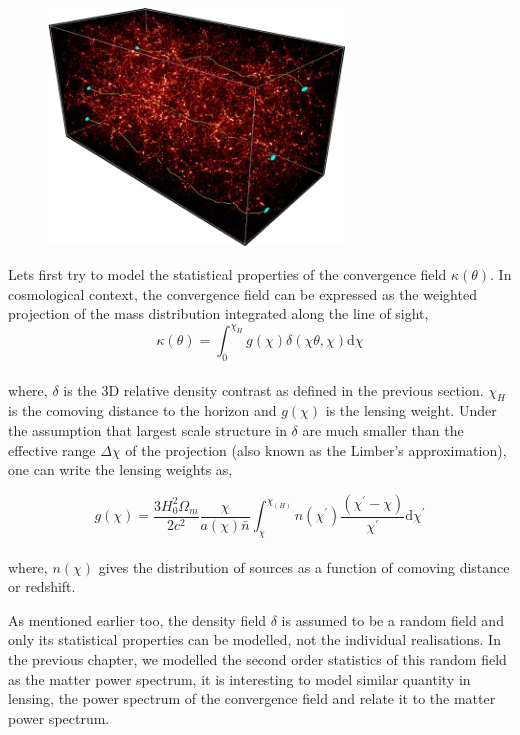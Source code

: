 \begin{figure}
	\centering
	\includegraphics[width=0.7\textwidth]{figures/weaklensing.png}
	\caption{}
	\label{fig:wl}
\end{figure}

Lets first try to model the statistical properties of the convergence field
$\kappa(\theta)$. In cosmological context, the convergence field can be expressed
as the weighted projection of the mass distribution integrated along the line of 
sight,
\begin{equation}
	\kappa(\theta) = \int_0^{\chi_H} g(\chi)\delta(\chi\theta,\chi) \mathrm{d}\chi
\end{equation}
\\
where, $\delta$ is the 3D relative density contrast as defined in the previous section.
$\chi_H$ is the comoving distance to the horizon and $g(\chi)$ is the lensing 
weight. Under the assumption that largest scale structure in $\delta$ are much smaller
than the effective range $\Delta \chi$ of the projection (also known as the Limber's 
approximation), one can write the lensing weights as,

\begin{equation}
	g(\chi) = \dfrac{3H_0^2\Omega_m}{2c^2} \dfrac{\chi}{a(\chi)\bar{n}} \int_{\chi}^{\chi_(H)}
					n(\chi^{\prime})
					\dfrac{(\chi^{\prime}-\chi)}{\chi^{\prime}}\mathrm{d}\chi^{\prime}
\end{equation}
\\
where, $n(\chi)$ gives the distribution of sources as a function of comoving distance or redshift.

As mentioned earlier too, the density field $\delta$ is assumed to be a random field
and only its statistical properties can be modelled, not the individual realisations. 
In the previous chapter, we modelled the second order statistics of this random field
as the matter power spectrum, it is interesting to model similar quantity in lensing,
the power spectrum of the convergence field and relate it to the matter power spectrum.


